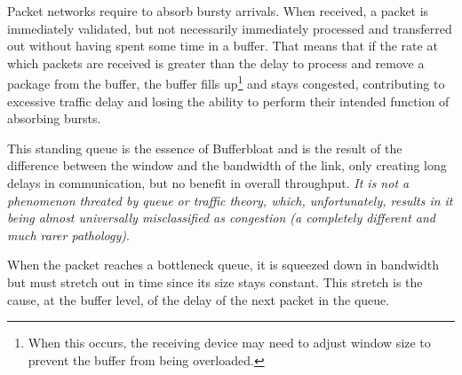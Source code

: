 Packet networks require to absorb bursty arrivals. When received, a packet is immediately validated, but
not necessarily immediately processed and transferred out without having spent some time in a
buffer. That means that if the rate at which packets are received is greater
than the delay to process and remove a package from the buffer, the buffer
fills up\footnote{When this occurs, the receiving device may need to
adjust window size to prevent the buffer from being overloaded.} and stays
congested, contributing to excessive traffic delay and losing the ability to
perform their intended function of absorbing bursts.

This standing queue is the essence of Bufferbloat and is the result of the
difference between the window and the bandwidth of the link, only creating
long delays in communication, but no benefit in overall throughput. \emph{It
is not a phenomenon threated by queue or traffic theory, which, unfortunately,
results in it being almost universally misclassified as congestion (a
completely different and much rarer pathology)}\cite{CACMStaff}.

When the packet reaches a bottleneck queue, it is squeezed down in bandwidth but
must stretch out in time since its size stays constant. This stretch is the
cause, at the buffer level, of the delay of the next packet in the queue.
